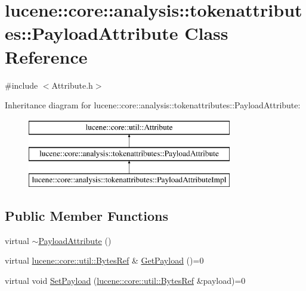 \hypertarget{classlucene_1_1core_1_1analysis_1_1tokenattributes_1_1PayloadAttribute}{}\section{lucene\+:\+:core\+:\+:analysis\+:\+:tokenattributes\+:\+:Payload\+Attribute Class Reference}
\label{classlucene_1_1core_1_1analysis_1_1tokenattributes_1_1PayloadAttribute}


{\ttfamily \#include $<$Attribute.\+h$>$}

Inheritance diagram for lucene\+:\+:core\+:\+:analysis\+:\+:tokenattributes\+:\+:Payload\+Attribute\+:\begin{figure}[H]
\begin{center}
\leavevmode
\includegraphics[height=3.000000cm]{classlucene_1_1core_1_1analysis_1_1tokenattributes_1_1PayloadAttribute}
\end{center}
\end{figure}
\subsection*{Public Member Functions}
\begin{DoxyCompactItemize}
\item 
virtual \mbox{\hyperlink{classlucene_1_1core_1_1analysis_1_1tokenattributes_1_1PayloadAttribute_a4211337eb33c29f8dbb035ef9d4db940}{$\sim$\+Payload\+Attribute}} ()
\item 
virtual \mbox{\hyperlink{classlucene_1_1core_1_1util_1_1BytesRef}{lucene\+::core\+::util\+::\+Bytes\+Ref}} \& \mbox{\hyperlink{classlucene_1_1core_1_1analysis_1_1tokenattributes_1_1PayloadAttribute_ad6f64222c371631ce979ba6f7256a11d}{Get\+Payload}} ()=0
\item 
virtual void \mbox{\hyperlink{classlucene_1_1core_1_1analysis_1_1tokenattributes_1_1PayloadAttribute_a52bb5ae9332ad24a12be66374e1f1bcb}{Set\+Payload}} (\mbox{\hyperlink{classlucene_1_1core_1_1util_1_1BytesRef}{lucene\+::core\+::util\+::\+Bytes\+Ref}} \&payload)=0
\end{DoxyCompactItemize}
